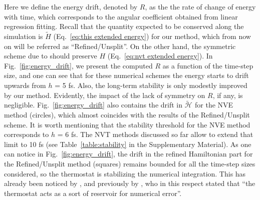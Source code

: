 \documentclass[
journal=jctcce,
layout=twocolumn
]{achemso}
\newcommand{\Ham}[1]{{\mathcal H}_\text{#1}}    %
\newcommand{\timestep}{h}
\newcommand{\refined}[1]{\widetilde{#1}}
\begin{document}
Here we define the energy drift, denoted by $R$, as the the rate of change of energy with time, which corresponds to the angular coefficient obtained from linear regression fitting.
Recall that the quantity expected to be conserved along the simulation is $\widetilde{H}$ (Eq.~\eqref{eq:this extended energy}) for our method, which from now on will be referred as ``Refined/Unsplit''.
On the other hand, the symmetric scheme due to \citeauthor{Martyna_1996} \cite{Martyna_1996} should preserve $H$ (Eq.~\eqref{eq:nvt extended energy}).
In Fig.~\ref{fig:energy_drift}, we present the computed $R$ as a function of the time-step size, and one can see that for these numerical schemes the energy starts to drift upwards from $\timestep$ = 5 fs. 
Also, the long-term stability is only modestly improved by our method. Evidently, the impact of the lack of symmetry on $R$, if any, is negligible.
Fig.~\ref{fig:energy_drift} also contains the drift in $\refined{\Ham{}}$ for the NVE method \cite{Silveira_2017} (circles), which almost coincides with the results of the Refined/Unsplit scheme. It is worth mentioning that the stability threshold for the NVE method corresponds to $\timestep$ = 6 fs.
The NVT methods discussed so far allow to extend that limit to 10 fs (see Table~\ref{table:stability} in the Supplementary Material). As one can notice in Fig.~\ref{fig:energy_drift}, the drift in the refined Hamiltonian part for the Refined/Unsplit method (squares) remains bounded for all the time-step sizes considered, so the thermostat is stabilizing the numerical integration.
This has already been noticed by \citeauthor{Davidchack_2010} \cite{Davidchack_2010}, and previously by \citeauthor{Bond_2007} \cite{Bond_2007}, who in this respect stated that ``the thermostat acts as a sort of reservoir for numerical error''.
\end{document}
